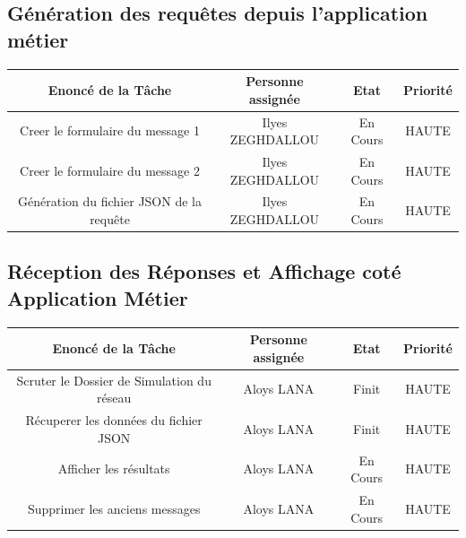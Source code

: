 \documentclass[a4paper, 11pt]{article}
\begin{document}
    \subsection{Génération des requêtes depuis l'application métier}
    \begin{center}
    \begin{tabular}{|c|c|c|c|}
        \hline
        Enoncé de la Tâche & Personne assignée & Etat & Priorité\\
        \hline
        \hline
        Creer le formulaire du message 1  & Ilyes ZEGHDALLOU & En Cours & HAUTE \\
        \hline
        Creer le formulaire du message 2  & Ilyes ZEGHDALLOU & En Cours & HAUTE \\
        \hline
        Génération du fichier JSON de la requête  & Ilyes ZEGHDALLOU & En Cours & HAUTE \\
        \hline
    \end{tabular}
    \end{center}

    \subsection{Réception des Réponses et Affichage coté Application Métier}
    \begin{center}
    \begin{tabular}{|c|c|c|c|}
        \hline
        Enoncé de la Tâche & Personne assignée & Etat & Priorité\\
        \hline
        \hline
        Scruter le Dossier de Simulation du réseau  & Aloys LANA & Finit & HAUTE \\
        \hline
        Récuperer les données du fichier JSON  & Aloys LANA & Finit & HAUTE \\
        \hline
        Afficher les résultats  & Aloys LANA & En Cours & HAUTE \\
        \hline
        Supprimer les anciens messages  & Aloys LANA & En Cours & HAUTE \\
        \hline
    \end{tabular}
    \end{center}
\end{document}
